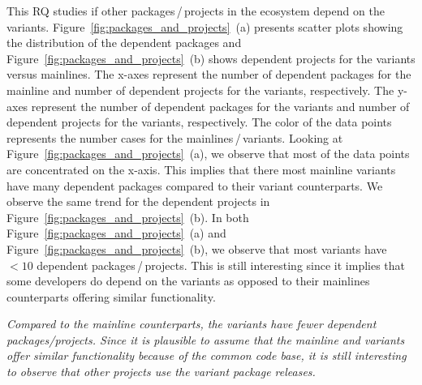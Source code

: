 This RQ studies if other packages\,/\,projects in the ecosystem depend on the variants.
Figure~\ref{fig:packages_and_projects}~(a) presents scatter plots showing the distribution of the dependent packages and Figure~\ref{fig:packages_and_projects}~(b) shows dependent projects for the variants versus mainlines.
The x-axes represent the number of dependent packages for the mainline and number of dependent projects for the variants, respectively.
The y-axes represent the number of dependent packages for the variants and number of dependent projects for the variants, respectively.
The color of the data points represents the number cases for the mainlines\,/\,variants.
Looking at Figure~\ref{fig:packages_and_projects}~(a), we observe that most of the data points are concentrated on the x-axis. 
This implies that there most mainline variants have many dependent packages compared to their variant counterparts.
We observe the same trend for the dependent projects in Figure~\ref{fig:packages_and_projects}~(b).
In both Figure~\ref{fig:packages_and_projects}~(a) and Figure~\ref{fig:packages_and_projects}~(b), we observe that most variants have $<10$ dependent packages\,/\,projects. 
This is still interesting since it implies that some developers do depend on the variants as opposed to their mainlines counterparts offering similar functionality. 

\begin{framed}
\noindent
\emph{Compared to the mainline counterparts, the variants have fewer dependent packages/projects. Since it is plausible to assume that the mainline and variants offer similar functionality because of the common code base, it is still interesting to observe that other projects use the variant package releases.}
\end{framed}
